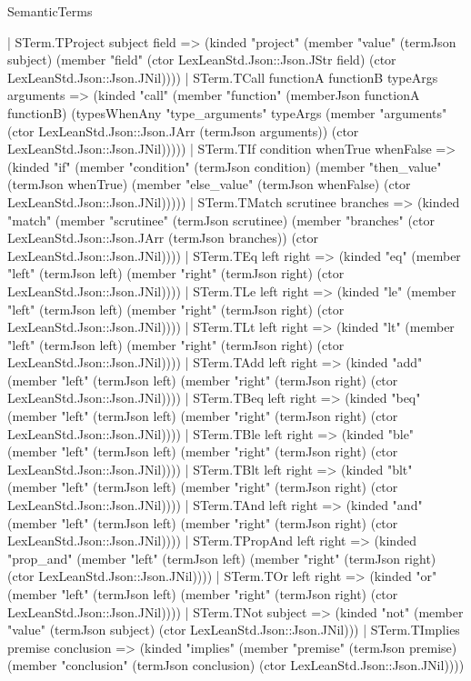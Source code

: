 \begin{lexlean}{SemanticTerms}
\begin{semanticmodule}
{    | STerm.TProject subject field => (kinded "project" (member "value" (termJson subject) (member "field" (ctor LexLeanStd.Json::Json.JStr field) (ctor LexLeanStd.Json::Json.JNil))))
    | STerm.TCall functionA functionB typeArgs arguments => (kinded "call" (member "function" (memberJson functionA functionB) (typesWhenAny "type_arguments" typeArgs (member "arguments" (ctor LexLeanStd.Json::Json.JArr (termJson arguments)) (ctor LexLeanStd.Json::Json.JNil)))))
    | STerm.TIf condition whenTrue whenFalse => (kinded "if" (member "condition" (termJson condition) (member "then_value" (termJson whenTrue) (member "else_value" (termJson whenFalse) (ctor LexLeanStd.Json::Json.JNil)))))
    | STerm.TMatch scrutinee branches => (kinded "match" (member "scrutinee" (termJson scrutinee) (member "branches" (ctor LexLeanStd.Json::Json.JArr (termJson branches)) (ctor LexLeanStd.Json::Json.JNil))))
    | STerm.TEq left right => (kinded "eq" (member "left" (termJson left) (member "right" (termJson right) (ctor LexLeanStd.Json::Json.JNil))))
    | STerm.TLe left right => (kinded "le" (member "left" (termJson left) (member "right" (termJson right) (ctor LexLeanStd.Json::Json.JNil))))
    | STerm.TLt left right => (kinded "lt" (member "left" (termJson left) (member "right" (termJson right) (ctor LexLeanStd.Json::Json.JNil))))
    | STerm.TAdd left right => (kinded "add" (member "left" (termJson left) (member "right" (termJson right) (ctor LexLeanStd.Json::Json.JNil))))
    | STerm.TBeq left right => (kinded "beq" (member "left" (termJson left) (member "right" (termJson right) (ctor LexLeanStd.Json::Json.JNil))))
    | STerm.TBle left right => (kinded "ble" (member "left" (termJson left) (member "right" (termJson right) (ctor LexLeanStd.Json::Json.JNil))))
    | STerm.TBlt left right => (kinded "blt" (member "left" (termJson left) (member "right" (termJson right) (ctor LexLeanStd.Json::Json.JNil))))
    | STerm.TAnd left right => (kinded "and" (member "left" (termJson left) (member "right" (termJson right) (ctor LexLeanStd.Json::Json.JNil))))
    | STerm.TPropAnd left right => (kinded "prop_and" (member "left" (termJson left) (member "right" (termJson right) (ctor LexLeanStd.Json::Json.JNil))))
    | STerm.TOr left right => (kinded "or" (member "left" (termJson left) (member "right" (termJson right) (ctor LexLeanStd.Json::Json.JNil))))
    | STerm.TNot subject => (kinded "not" (member "value" (termJson subject) (ctor LexLeanStd.Json::Json.JNil)))
    | STerm.TImplies premise conclusion => (kinded "implies" (member "premise" (termJson premise) (member "conclusion" (termJson conclusion) (ctor LexLeanStd.Json::Json.JNil))))
}
\end{semanticmodule}
\end{lexlean}
